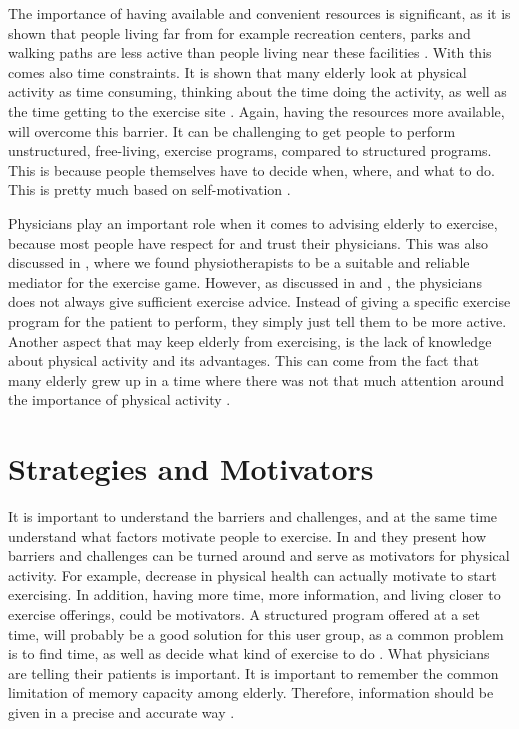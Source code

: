 The importance of having available and convenient resources is significant, as it is shown that people living far from for example recreation centers, parks and walking paths are less active than people living near these facilities \cite{schutzer}. With this comes also time constraints. It is shown that many elderly look at physical activity as time consuming, thinking about the time doing the activity, as well as the time getting to the exercise site \cite{schutzer} \cite{chao}. Again, having the resources more available, will overcome this barrier. It can be challenging to get people to perform unstructured, free-living, exercise programs, compared to structured programs. This is because people themselves have to decide when, where, and what to do. This is pretty much based on self-motivation \cite{chao}.  

Physicians play an important role when it comes to advising elderly to exercise, because most people have respect for and trust their physicians. This was also discussed in \cite{project}, where we found physiotherapists to be a suitable and reliable mediator for the exercise game. However, as discussed in \cite{schutzer} and \cite{chao}, the physicians does not always give sufficient exercise advice. Instead of giving a specific exercise program for the patient to perform, they simply just tell them to be more active. Another aspect that may keep elderly from exercising, is the lack of knowledge about physical activity and its advantages. This can come from the fact that many elderly grew up in a time where there was not that much attention around the importance of physical activity \cite{schutzer}. 

\section{Strategies and Motivators}
\label{sec:motivators}
It is important to understand the barriers and challenges, and at the same time understand what factors motivate people to exercise. In \cite{schutzer} and \cite{chao} they present how barriers and challenges can be turned around and serve as motivators for physical activity. For example, decrease in physical health can actually motivate to start exercising. In addition,  having more time, more information, and living closer to exercise offerings, could be motivators.  A structured program offered at a set time, will probably be a good solution for this user group, as a common problem is to find time, as well as decide what kind of exercise to do \cite{chao}. What physicians are telling their patients is important. It is important to remember the common limitation of memory capacity among elderly. Therefore, information should be given in a precise and accurate way \cite{chao}.  

